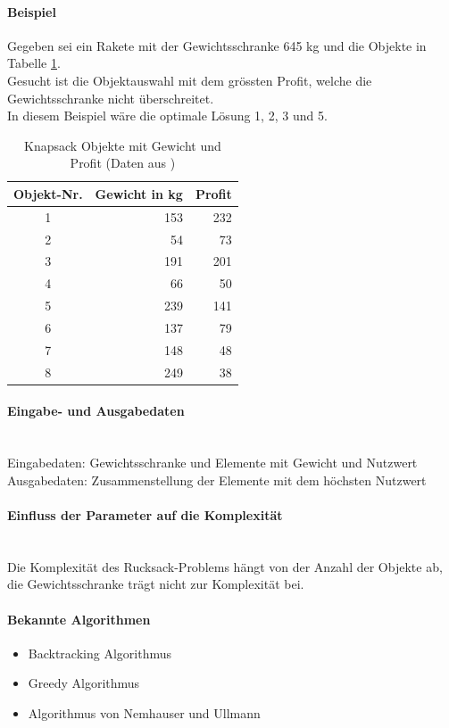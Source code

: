 	\paragraph{Beispiel} Gegeben sei ein Rakete mit der Gewichtsschranke 645 kg und die Objekte in Tabelle \ref{table:knapsack_objects}.\\
Gesucht ist die Objektauswahl mit dem grössten Profit, welche die Gewichtsschranke nicht überschreitet.\\
In diesem Beispiel wäre die optimale Lösung 1, 2, 3 und 5. \cite{knapsack_desc_web}

\begin{table}[ht]
\centering
  \begin{tabular}{ c | r | r }
	\hline
	\rowcolor{gray}
	\textbf{Objekt-Nr.}	&	\textbf{Gewicht in kg}	&	\textbf{Profit}\\ \hline
	1			&	153			&	232\\ \hline
	2			&	54			&	73\\ \hline
	3			&	191			&	201\\ \hline
	4			&	66			&	50\\ \hline
	5			&	239			&	141\\ \hline
	6			&	137			&	79\\ \hline
	7			&	148			&	48\\ \hline
	8			&	249			&	38
  \end{tabular}
   \caption[Knapsack Objekte mit Gewicht und Profit]{Knapsack Objekte mit Gewicht und Profit (Daten aus \cite{knapsack_desc_web})}\label{table:knapsack_objects}
\end{table}

	\paragraph{Eingabe- und Ausgabedaten}\mbox{}\\
	Eingabedaten: Gewichtsschranke und Elemente mit Gewicht und Nutzwert\\
	Ausgabedaten: Zusammenstellung der Elemente mit dem höchsten Nutzwert

	\paragraph{Einfluss der Parameter auf die Komplexität}\mbox{}\\
	Die Komplexität des Rucksack-Problems hängt von der Anzahl der Objekte ab, die Gewichtsschranke trägt nicht zur Komplexität bei.

	\paragraph{Bekannte Algorithmen}
	\begin{itemize}
		\item Backtracking Algorithmus
		\item Greedy Algorithmus
		\item Algorithmus von Nemhauser und Ullmann \cite{knapsack_desc_web}
	\end{itemize}	

